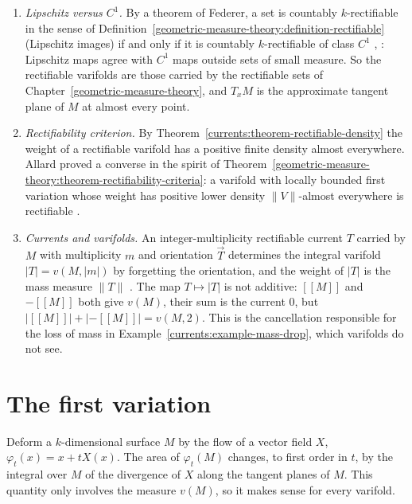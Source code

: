 \begin{remark}\label{currents:remark-rectifiable}
\begin{enumerate}
\item \emph{Lipschitz versus $C^1$.} By a theorem of Federer, a set is countably $k$-rectifiable in the sense of Definition~\ref{geometric-measure-theory:definition-rectifiable} (Lipschitz images) if and only if
it is countably $k$-rectifiable of class $C^1$ \cite{federer-gmt}, \cite{simon-gmt}: Lipschitz maps agree with $C^1$ maps outside sets of small measure. So the rectifiable varifolds are those carried by
the rectifiable sets of Chapter~\ref{geometric-measure-theory}, and $T_xM$ is the approximate tangent plane of $M$ at almost every point.
\item \emph{Rectifiability criterion.} By Theorem~\ref{currents:theorem-rectifiable-density} the weight of a rectifiable varifold has a positive finite density almost everywhere. Allard proved a converse in the
spirit of Theorem~\ref{geometric-measure-theory:theorem-rectifiability-criteria}: a varifold with locally bounded first variation whose weight has positive lower density $\|V\|$-almost everywhere is
rectifiable \cite{allard-1972}.
\item \emph{Currents and varifolds.} An integer-multiplicity rectifiable current $T$ carried by $M$ with multiplicity $m$ and orientation $\vec{T}$ determines the integral varifold $|T| = v(M, |m|)$ by
forgetting the orientation, and the weight of $|T|$ is the mass measure $\|T\|$ \cite{simon-gmt}. The map $T \mapsto |T|$ is not additive: $[\![M]\!]$ and $-[\![M]\!]$ both give $v(M)$, their sum is the
current $0$, but $|[\![M]\!]| + |-[\![M]\!]| = v(M, 2)$. This is the cancellation responsible for the loss of mass in Example~\ref{currents:example-mass-drop}, which varifolds do not see.
\end{enumerate}
\end{remark}

\section{The first variation}\label{currents:section-first-variation}

Deform a $k$-dimensional surface $M$ by the flow of a vector field $X$, $\varphi_t(x) = x + tX(x)$. The area of $\varphi_t(M)$ changes, to first order in $t$, by the integral over $M$ of the divergence of $X$
along the tangent planes of $M$. This quantity only involves the measure $v(M)$, so it makes sense for every varifold.


